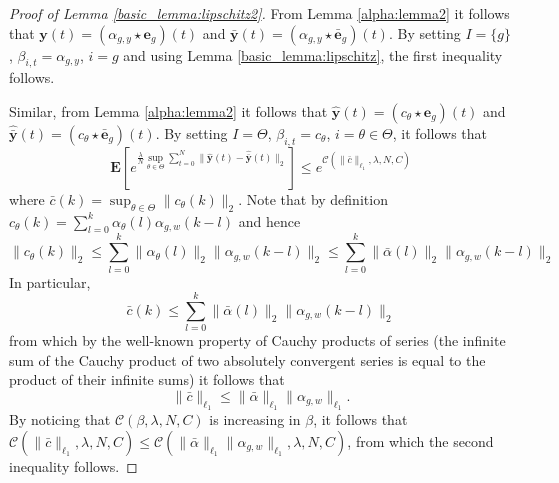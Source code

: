 \documentclass{article}
\newcommand{\e}{\mathbf{e}}
\newcommand{\y}{\mathbf{y}}
\newcommand{\bE}{\mathbf{E}}
\begin{document}
\begin{proof}[Proof of Lemma \ref{basic_lemma:lipschitz2}]
  From Lemma \ref{alpha:lemma2} it follows that 
  $\y(t)=(\alpha_{g,y} \star \e_g)(t)$ and 
  $\bar{\y}(t)=(\alpha_{g,y} \star \bar{\e}_g)(t)$.
  By setting $I=\{g\}$, $\beta_{i,t}=\alpha_{g,y}$, $i=g$
  and using Lemma \ref{basic_lemma:lipschitz}, the first inequality follows.

  Similar, from Lemma \ref{alpha:lemma2} it follows that 
  $\hat{\y}(t)=(c_{\theta} \star \e_g)(t)$ and 
  $\hat{\bar{\y}}(t)=(c_{\theta} \star \bar{\e}_g)(t)$.
  By setting $I=\Theta$, $\beta_{i,t}=c_{\theta}$, $i=\theta \in \Theta$, 
  it follows that 
  \[ \bE[e^{\frac{\lambda}{N} \sup_{\theta \in \Theta}\sum_{t=0}^{N} \|\hat{\y}(t)-\hat{\bar{\y}}(t)\|_2}] \le e^{\mathcal{C}(\|\bar{c}\|_{\ell_1},\lambda,N,C)} 
  \]
  where $\bar{c}(k)=\sup_{\theta \in \Theta} \|c_{\theta}(k)\|_2$.
  Note that by definition 
  $c_{\theta}(k)=\sum_{l=0}^{k} \alpha_{\theta}(l) \alpha_{g,w}(k-l)$ and hence 
  \[
     \|c_{\theta}(k)\|_2 \le \sum_{l=0}^{k} \|\alpha_\theta(l)\|_2 \|\alpha_{g,w}(k-l)\|_2
    \le \sum_{l=0}^{k} \|\bar{\alpha}(l)\|_2 \|\alpha_{g,w}(k-l)\|_2
  \]
  In particular, 
  \[
      \bar{c}(k) \le \sum_{l=0}^{k} \|\bar{\alpha}(l)\|_2 \|\alpha_{g,w}(k-l)\|_2
  \]
  from which by the well-known property of Cauchy products of series (the infinite sum of the Cauchy product of two absolutely convergent series is equal to the product of their infinite sums) it follows
  that
  \[ \|\bar{c}\|_{\ell_1} \le \|\bar{\alpha}\|_{\ell_1} \|\alpha_{g,w}\|_{\ell_1}.
  \]
  By noticing that $\mathcal{C}(\beta,\lambda,N,C)$ is increasing in $\beta$, it 
  follows that $\mathcal{C}(\|\bar{c}\|_{\ell_1},\lambda,N,C) \le \mathcal{C}(\|\bar{\alpha}\|_{\ell_1} \|\alpha_{g,w}\|_{\ell_1},\lambda,N,C)$, from which the second inequality follows. 



\end{proof}
\end{document}
